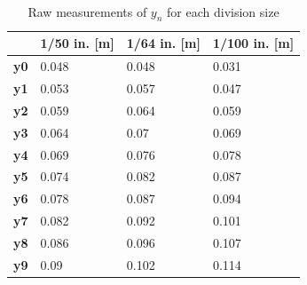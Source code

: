 \documentclass{article}
\begin{document}
\paragraph{}

\begin{table}[h]
\begin{tabular}{l|l|l|l|}
\cline{2-4}
                                  & \textbf{1/50 in. {[}m{]}} & \textbf{1/64 in. {[}m{]}} & \textbf{1/100 in. {[}m{]}} \\ \hline
\multicolumn{1}{|l|}{\textbf{y0}} & 0.048                     & 0.048                     & 0.031                      \\ \hline
\multicolumn{1}{|l|}{\textbf{y1}} & 0.053                     & 0.057                     & 0.047                      \\ \hline
\multicolumn{1}{|l|}{\textbf{y2}} & 0.059                     & 0.064                     & 0.059                      \\ \hline
\multicolumn{1}{|l|}{\textbf{y3}} & 0.064                     & 0.07                      & 0.069                      \\ \hline
\multicolumn{1}{|l|}{\textbf{y4}} & 0.069                     & 0.076                     & 0.078                      \\ \hline
\multicolumn{1}{|l|}{\textbf{y5}} & 0.074                     & 0.082                     & 0.087                      \\ \hline
\multicolumn{1}{|l|}{\textbf{y6}} & 0.078                     & 0.087                     & 0.094                      \\ \hline
\multicolumn{1}{|l|}{\textbf{y7}} & 0.082                     & 0.092                     & 0.101                      \\ \hline
\multicolumn{1}{|l|}{\textbf{y8}} & 0.086                     & 0.096                     & 0.107                      \\ \hline
\multicolumn{1}{|l|}{\textbf{y9}} & 0.09                      & 0.102                     & 0.114                      \\ \hline
\end{tabular}
\caption{Raw measurements of $y_n$ for each division size}
\label{tb:raw_data}
\end{table}
\end{document}
